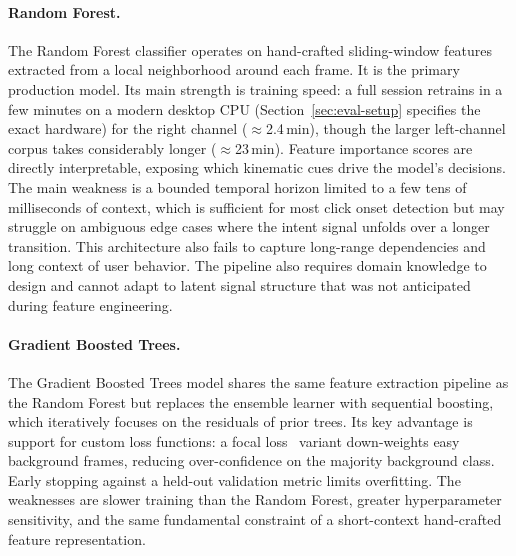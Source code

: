 \paragraph{Random Forest.}
The Random Forest classifier operates on hand-crafted sliding-window features extracted from a local neighborhood around each frame. It is the primary production model. Its main strength is training speed: a full session retrains in a few minutes on a modern desktop CPU (Section~\ref{sec:eval-setup} specifies the exact hardware) for the right channel ($\approx$2.4\,min), though the larger left-channel corpus takes considerably longer ($\approx$23\,min).
Feature importance scores are directly interpretable, exposing which kinematic cues drive the model's decisions. The main weakness is a bounded temporal horizon limited to a few tens of milliseconds of context, which is sufficient for most click onset detection but may struggle on ambiguous edge cases where the intent signal unfolds over a longer transition. This architecture also fails to capture long-range dependencies and long context of user behavior. The pipeline also requires domain knowledge to design and cannot adapt to latent signal structure that was not anticipated during feature engineering.

\paragraph{Gradient Boosted Trees.}
The Gradient Boosted Trees model shares the same feature extraction pipeline as the Random Forest but replaces the ensemble learner with sequential boosting, which iteratively focuses on the residuals of prior trees. Its key advantage is support for custom loss functions: a focal loss~\cite{lin_focal_2017} variant down-weights easy background frames, reducing over-confidence on the majority background class. Early stopping against a held-out validation metric limits overfitting. The weaknesses are slower training than the Random Forest, greater hyperparameter sensitivity, and the same fundamental constraint of a short-context hand-crafted feature representation.

